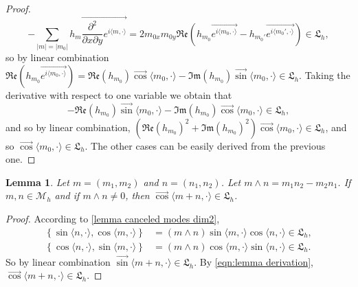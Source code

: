 \documentclass[10pt]{article}
\newcommand{\p}{\partial}
\newcommand{\M}{{\mathcal M}}
\newcommand{\la}{\langle}
\newcommand{\ra}{\rangle}
\newcommand{\f}{\overrightarrow}
\newcommand{\we}{\wedge}
\newtheorem{lemma}{Lemma}
\begin{document}
\begin{proof}
\begin{equation*}
    -\sum_{|m|=|m_0|}h_m\f{\frac{\p^2}{\p x\p y}e^{i \la m , \cdot\ra }}=2m_{0x}m_{0y}\mathfrak{Re}(h_{m_0}\f{e^{i\la m_0, \cdot \ra}} - h_{m_0'}\f{e^{i\la m_0', \cdot \ra}}) \in \mathfrak{L}_h,
\end{equation*}
so by linear combination $\mathfrak{Re}(h_{m_0}\f{e^{i\la m_0, \cdot \ra}})=\mathfrak{Re}(h_{m_0})\f{\cos} \la m_0,\cdot \ra - \mathfrak{Im}(h_{m_0})\f{\sin}\la m_0,\cdot\ra\in \mathfrak{L}_h$. Taking the derivative with respect to one variable we obtain that
\begin{equation*}
    -\mathfrak{Re}(h_{m_0})\f{\sin} \la m_0,\cdot \ra - \mathfrak{Im}(h_{m_0})\f{\cos}\la m_0,\cdot\ra \in \mathfrak{L}_h,
\end{equation*}
and so by linear combination, $(\mathfrak{Re}(h_{m_0})^2+\mathfrak{Im}(h_{m_0})^2)\f{\cos}\la m_0, \cdot \ra \in \mathfrak{L}_h$, and so $\f{\cos}\la m_0,\cdot \ra \in \mathfrak{L}_h$. The other cases can be easily derived from the previous one.
\end{proof}

\begin{lemma} \label{addition modes dim 2}
    Let $m=(m_1,m_2)$ and $n=(n_1,n_2)$. Let $m \we n = m_1n_2-m_2n_1$. If $m,n \in \M_h$ and if $m\we n \neq 0$, then $\f{\cos}\la m+n, \cdot \ra \in \mathfrak{L}_h$.
\end{lemma}

\begin{proof}
According to \cref{lemma canceled modes dim2}, 
\begin{align*}
    \left\{\sin\la n, \cdot \ra,\cos\la m, \cdot \ra \right\}&=(m \we n)\sin \la m, \cdot \ra \cos \la n, \cdot \ra \in \mathfrak{L}_h, \\
    \left\{\cos\la n, \cdot \ra,\sin \la m, \cdot \ra \right\}&=(m \we n) \cos \la m,\cdot \ra \sin \la n, \cdot \ra \in \mathfrak{L}_h.
\end{align*}
So by linear combination $\f{\sin} \la m+n, \cdot \ra \in \mathfrak{L}_h$. By \eqref{eqn:lemma derivation}, $\f{\cos}\la m+n, \cdot \ra \in \mathfrak{L}_h$.
\end{proof}
\end{document}
